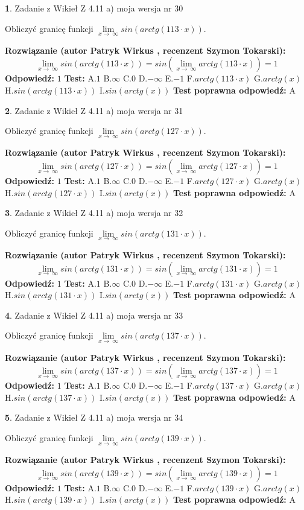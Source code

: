 \documentclass[12pt, a4paper]{article}
\theoremstyle{definition} %
\newtheorem{zad}{}
\newcommand{\zadStart}[1]{\begin{zad}#1\newline}
\newcommand{\zadStop}{\end{zad}}
\newcommand{\rozwStart}[2]{\noindent \textbf{Rozwiązanie (autor #1 , recenzent #2): }\newline}
\newcommand{\rozwStop}{\newline}
\newcommand{\odpStart}{\noindent \textbf{Odpowiedź:}\newline}
\newcommand{\odpStop}{\newline}
\newcommand{\testStart}{\noindent \textbf{Test:}\newline}
\newcommand{\testStop}{\newline}
\newcommand{\kluczStart}{\noindent \textbf{Test poprawna odpowiedź:}\newline}
\newcommand{\kluczStop}{\newline}
\begin{document}
\zadStart{Zadanie z Wikieł Z 4.11 a) moja wersja nr 30}

Obliczyć granicę funkcji  $\lim\limits_{x\to\ \infty}sin(arctg(113\cdot x))$.
\zadStop
\rozwStart{Patryk Wirkus}{Szymon Tokarski}
$$\lim\limits_{x\to\ \infty}sin(arctg(113\cdot x)) = sin(\lim\limits_{x\to\ \infty}arctg(113\cdot x)) = 1$$
\rozwStop
\odpStart
$1$
\odpStop
\testStart
A.$1$ B.$\infty$ C.$0$ D.$-\infty$ E.$-1$
F.$arctg(113\cdot x)$ G.$arctg(x)$
H.$sin(arctg(113\cdot x))$
I.$sin(arctg(x))$
\testStop
\kluczStart
A
\kluczStop



\zadStart{Zadanie z Wikieł Z 4.11 a) moja wersja nr 31}

Obliczyć granicę funkcji  $\lim\limits_{x\to\ \infty}sin(arctg(127\cdot x))$.
\zadStop
\rozwStart{Patryk Wirkus}{Szymon Tokarski}
$$\lim\limits_{x\to\ \infty}sin(arctg(127\cdot x)) = sin(\lim\limits_{x\to\ \infty}arctg(127\cdot x)) = 1$$
\rozwStop
\odpStart
$1$
\odpStop
\testStart
A.$1$ B.$\infty$ C.$0$ D.$-\infty$ E.$-1$
F.$arctg(127\cdot x)$ G.$arctg(x)$
H.$sin(arctg(127\cdot x))$
I.$sin(arctg(x))$
\testStop
\kluczStart
A
\kluczStop



\zadStart{Zadanie z Wikieł Z 4.11 a) moja wersja nr 32}

Obliczyć granicę funkcji  $\lim\limits_{x\to\ \infty}sin(arctg(131\cdot x))$.
\zadStop
\rozwStart{Patryk Wirkus}{Szymon Tokarski}
$$\lim\limits_{x\to\ \infty}sin(arctg(131\cdot x)) = sin(\lim\limits_{x\to\ \infty}arctg(131\cdot x)) = 1$$
\rozwStop
\odpStart
$1$
\odpStop
\testStart
A.$1$ B.$\infty$ C.$0$ D.$-\infty$ E.$-1$
F.$arctg(131\cdot x)$ G.$arctg(x)$
H.$sin(arctg(131\cdot x))$
I.$sin(arctg(x))$
\testStop
\kluczStart
A
\kluczStop



\zadStart{Zadanie z Wikieł Z 4.11 a) moja wersja nr 33}

Obliczyć granicę funkcji  $\lim\limits_{x\to\ \infty}sin(arctg(137\cdot x))$.
\zadStop
\rozwStart{Patryk Wirkus}{Szymon Tokarski}
$$\lim\limits_{x\to\ \infty}sin(arctg(137\cdot x)) = sin(\lim\limits_{x\to\ \infty}arctg(137\cdot x)) = 1$$
\rozwStop
\odpStart
$1$
\odpStop
\testStart
A.$1$ B.$\infty$ C.$0$ D.$-\infty$ E.$-1$
F.$arctg(137\cdot x)$ G.$arctg(x)$
H.$sin(arctg(137\cdot x))$
I.$sin(arctg(x))$
\testStop
\kluczStart
A
\kluczStop



\zadStart{Zadanie z Wikieł Z 4.11 a) moja wersja nr 34}

Obliczyć granicę funkcji  $\lim\limits_{x\to\ \infty}sin(arctg(139\cdot x))$.
\zadStop
\rozwStart{Patryk Wirkus}{Szymon Tokarski}
$$\lim\limits_{x\to\ \infty}sin(arctg(139\cdot x)) = sin(\lim\limits_{x\to\ \infty}arctg(139\cdot x)) = 1$$
\rozwStop
\odpStart
$1$
\odpStop
\testStart
A.$1$ B.$\infty$ C.$0$ D.$-\infty$ E.$-1$
F.$arctg(139\cdot x)$ G.$arctg(x)$
H.$sin(arctg(139\cdot x))$
I.$sin(arctg(x))$
\testStop
\kluczStart
A
\kluczStop
\end{document}
